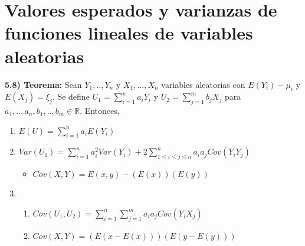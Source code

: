 \documentclass[12pt,letterpaper]{article}
\theoremstyle{definition}
\begin{document}
\section*{Valores esperados y varianzas de funciones lineales de variables aleatorias}

\textbf{5.8) Teorema:} Sean $Y_1,..,Y_n$ y $X_1,...,X_n$ variables aleatorias con $E(Y_i)-\mu_i$ y $E(X_j)=\xi_j$. Se define $U_1=\sum\limits^{n}_{i=1}a_iY_i$ y $U_2=\sum\limits^{m}_{j=1}b_jX_j$ para $a_1,..,a_n,b_1,..,b_m\in\mathbb{R}$. Entonces, 

\begin{enumerate}
	\item $E(U)=\sum\limits^{n}_{i=1} a_iE(Y_i)$
	\item $Var(U_1)=\sum\limits^{n}_{i=1} a_i^2 Var(Y_i)+2\sum\limits^{n}_{1\leq i\leq j \leq n}a_ia_j Cov(Y_iY_j)$
	\begin{itemize}
		\item $Cov(X,Y)=E(x,y)-(E(x))(E(y))$
	\end{itemize}
	\item
	\begin{enumerate}
		\item $Cov(U_1,U_2)= \sum\limits^{n}_{i=1}\sum\limits^{m}_{j=1}a_ia_jCov(Y_iX_j)$
		\item $Cov(X,Y)=(E(x-E(x)))(E(y-E(y)))$
	\end{enumerate}	 
\end{enumerate}
\end{document}
